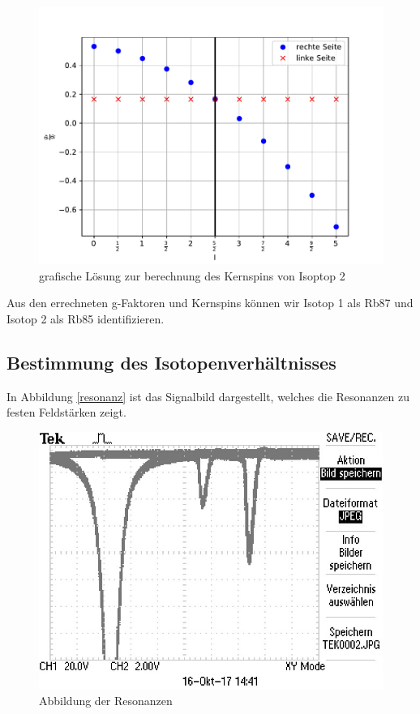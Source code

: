 \begin{figure}[H]
\centering
\includegraphics[scale=0.8]{./optischesPumpen/img/coreSpin2.pdf}
\caption{grafische Lösung zur berechnung des Kernspins von Isoptop 2}
\label{LandeIso2}
\end{figure}

Aus den errechneten g-Faktoren und Kernspins können wir Isotop 1 als Rb87 und Isotop 2 als Rb85 identifizieren.


\subsection{Bestimmung des Isotopenverhältnisses}
In Abbildung \autoref{resonanz} ist das Signalbild dargestellt, welches die Resonanzen zu festen
Feldstärken zeigt.

\begin{figure}[H]
\centering
\includegraphics[scale=0.8]{./optischesPumpen/img/TEK0002.JPG}
\caption{Abbildung der Resonanzen}
\label{resonanz}
\end{figure}


